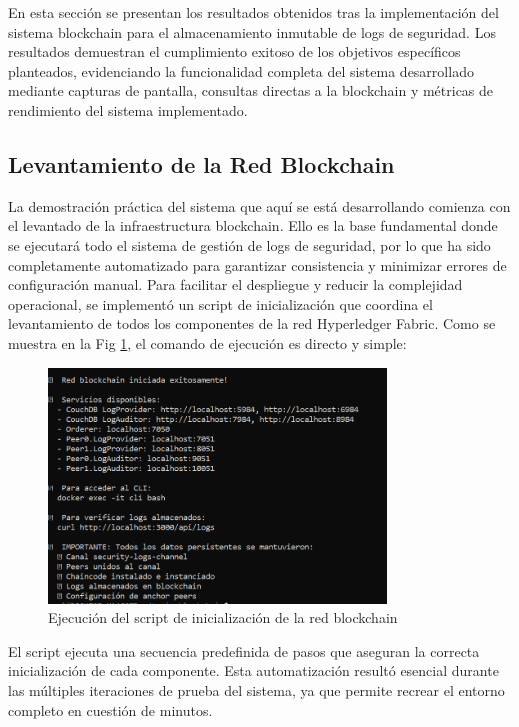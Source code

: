 En esta sección se presentan los resultados obtenidos tras la implementación del sistema blockchain para el almacenamiento inmutable de logs de seguridad. Los resultados demuestran el cumplimiento exitoso de los objetivos específicos planteados, evidenciando la funcionalidad completa del sistema desarrollado mediante capturas de pantalla, consultas directas a la blockchain y métricas de rendimiento del sistema implementado.

\subsection{Levantamiento de la Red Blockchain}
La demostración práctica del sistema que aquí se está desarrollando comienza con el levantado de la infraestructura blockchain. Ello es la base fundamental donde se ejecutará todo el sistema de gestión de logs de seguridad, por lo que ha sido completamente automatizado para garantizar consistencia y minimizar errores de configuración manual.
Para facilitar el despliegue y reducir la complejidad operacional, se implementó un script de inicialización que coordina el levantamiento de todos los componentes de la red Hyperledger Fabric. Como se muestra en la Fig \ref{fig:script_inicio}, el comando de ejecución es directo y simple:
\begin{figure}[htbp]
    \centering
    \includegraphics[width=0.8\textwidth]{figuras/script_inicio.png}
    \caption{Ejecución del script de inicialización de la red blockchain}
    \label{fig:script_inicio}
\end{figure}

El script ejecuta una secuencia predefinida de pasos que aseguran la correcta inicialización de cada componente. Esta automatización resultó esencial durante las múltiples iteraciones de prueba del sistema, ya que permite recrear el entorno completo en cuestión de minutos.

